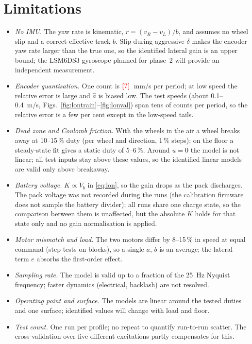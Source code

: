 \documentclass[conference]{IEEEtran}\newcommand{\haveieee}{}%
\newcommand{\todo}[1]{{\color{red}\textbf{[#1]}}}
\newcommand{\fallbackmacros}{\todo{?}}
\providecommand{\VquantMms}{\fallbackmacros}
\begin{document}
\section{Limitations}
\begin{itemize}
\item \emph{No IMU.} The yaw rate is kinematic, $r=(v_R-v_L)/b$, and assumes no wheel slip and a correct effective track $b$. Slip during aggressive $\delta$ makes the encoder yaw rate larger than the true one, so the identified lateral gain is an upper bound; the LSM6DS3 gyroscope planned for phase~2 will provide an independent measurement.
\item \emph{Encoder quantisation.} One count is $\VquantMms$~mm/s per period; at low speed the relative error is large and $\hat a$ is biased low. The test speeds (about 0.1--0.4~m/s, Figs.~\ref{fig:lontrain}--\ref{fig:lonval}) span tens of counts per period, so the relative error is a few per cent except in the low-speed tails.
\item \emph{Dead zone and Coulomb friction.} With the wheels in the air a wheel breaks away at 10--15\,\% duty (per wheel and direction, 1\,\% steps); on the floor a steady-state fit gives a static duty of 5--6\,\%. Around $u=0$ the model is not linear; all test inputs stay above these values, so the identified linear models are valid only above breakaway.
\item \emph{Battery voltage.} $K\propto V_b$ in \eqref{eq:lon}, so the gain drops as the pack discharges. The pack voltage was not recorded during the runs (the calibration firmware does not sample the battery divider); all runs share one charge state, so the comparison between them is unaffected, but the absolute $K$ holds for that state only and no gain normalisation is applied.
\item \emph{Motor mismatch and load.} The two motors differ by 8--15\,\% in speed at equal command (step tests on blocks), so a single $a$, $b$ is an average; the lateral term $e$ absorbs the first-order effect.
\item \emph{Sampling rate.} The model is valid up to a fraction of the 25~Hz Nyquist frequency; faster dynamics (electrical, backlash) are not resolved.
\item \emph{Operating point and surface.} The models are linear around the tested duties and one surface; identified values will change with load and floor.
\item \emph{Test count.} One run per profile; no repeat to quantify run-to-run scatter. The cross-validation over five different excitations partly compensates for this.
\end{itemize}
\end{document}
